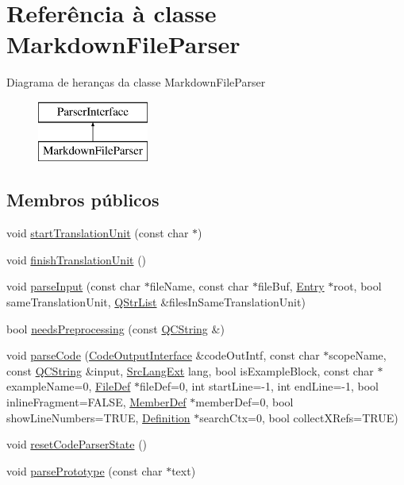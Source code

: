 \hypertarget{class_markdown_file_parser}{\section{Referência à classe Markdown\-File\-Parser}
\label{class_markdown_file_parser}
}
Diagrama de heranças da classe Markdown\-File\-Parser\begin{figure}[H]
\begin{center}
\leavevmode
\includegraphics[height=2.000000cm]{class_markdown_file_parser}
\end{center}
\end{figure}
\subsection*{Membros públicos}
\begin{DoxyCompactItemize}
\item 
void \hyperlink{class_markdown_file_parser_a9179d0b9461d5d683468fb6015d1643f}{start\-Translation\-Unit} (const char $\ast$)
\item 
void \hyperlink{class_markdown_file_parser_a245c1fbfb8ba359e61d832c4e7c6c98e}{finish\-Translation\-Unit} ()
\item 
void \hyperlink{class_markdown_file_parser_ab1ed2c75b61719cec6060b9f69419743}{parse\-Input} (const char $\ast$file\-Name, const char $\ast$file\-Buf, \hyperlink{class_entry}{Entry} $\ast$root, bool same\-Translation\-Unit, \hyperlink{class_q_str_list}{Q\-Str\-List} \&files\-In\-Same\-Translation\-Unit)
\item 
bool \hyperlink{class_markdown_file_parser_a6301dcea1a10e944a29dd655611f671e}{needs\-Preprocessing} (const \hyperlink{class_q_c_string}{Q\-C\-String} \&)
\item 
void \hyperlink{class_markdown_file_parser_ac614074ea2c569cabd265a6168ad36d2}{parse\-Code} (\hyperlink{class_code_output_interface}{Code\-Output\-Interface} \&code\-Out\-Intf, const char $\ast$scope\-Name, const \hyperlink{class_q_c_string}{Q\-C\-String} \&input, \hyperlink{types_8h_a9974623ce72fc23df5d64426b9178bf2}{Src\-Lang\-Ext} lang, bool is\-Example\-Block, const char $\ast$example\-Name=0, \hyperlink{class_file_def}{File\-Def} $\ast$file\-Def=0, int start\-Line=-\/1, int end\-Line=-\/1, bool inline\-Fragment=F\-A\-L\-S\-E, \hyperlink{class_member_def}{Member\-Def} $\ast$member\-Def=0, bool show\-Line\-Numbers=T\-R\-U\-E, \hyperlink{class_definition}{Definition} $\ast$search\-Ctx=0, bool collect\-X\-Refs=T\-R\-U\-E)
\item 
void \hyperlink{class_markdown_file_parser_a5d8e0ded4118b6eff98aa23eb64db02c}{reset\-Code\-Parser\-State} ()
\item 
void \hyperlink{class_markdown_file_parser_a022344e4fa95056a941a9e8c02334872}{parse\-Prototype} (const char $\ast$text)
\end{DoxyCompactItemize}


